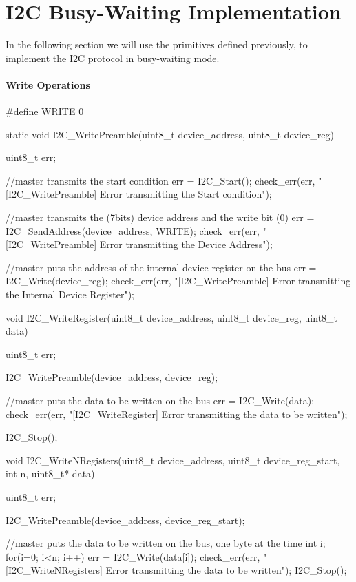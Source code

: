 \section{I2C Busy-Waiting Implementation}

In the following section we will use the primitives defined previously, to implement the I2C protocol in busy-waiting mode.
\paragraph{Write Operations}
\begin{ccode}
	#define WRITE 0

	static void I2C_WritePreamble(uint8_t device_address, uint8_t device_reg) {
		uint8_t err;
		
		//master transmits the start condition
		err = I2C_Start();
		check_err(err, "[I2C_WritePreamble] Error transmitting the Start condition");
	
		//master transmits the (7bits) device address and the write bit (0)
		err = I2C_SendAddress(device_address, WRITE);
		check_err(err, "[I2C_WritePreamble] Error transmitting the Device Address");

		//master puts the address of the internal device register on the bus
		err = I2C_Write(device_reg);
		check_err(err, "[I2C_WritePreamble] Error transmitting the Internal Device Register");
	}

	void I2C_WriteRegister(uint8_t device_address, uint8_t device_reg, uint8_t data) {
		uint8_t err;
	
		I2C_WritePreamble(device_address, device_reg);
	
		//master puts the data to be written on the bus
		err = I2C_Write(data);
		check_err(err, "[I2C_WriteRegister] Error transmitting the data to be written");

		I2C_Stop();
	}
	
	void I2C_WriteNRegisters(uint8_t device_address, uint8_t device_reg_start, int n, uint8_t* data) {
		uint8_t err;
	
		I2C_WritePreamble(device_address, device_reg_start);
	
		//master puts the data to be written on the bus, one byte at the time
		int i;
		for(i=0; i<n; i++) {
			err = I2C_Write(data[i]);
			check_err(err, "[I2C_WriteNRegisters] Error transmitting the data to be written");
		}
		I2C_Stop();
	}
\end{ccode}
